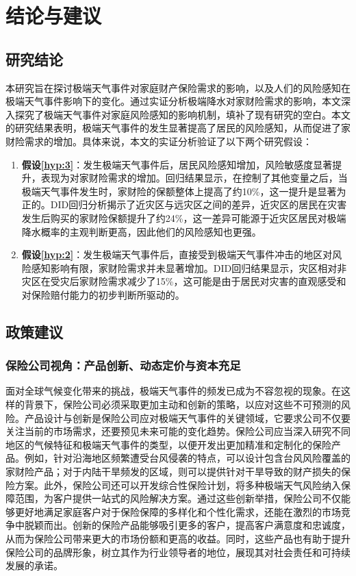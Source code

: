 \chapter{结论与建议}\label{chap:5}

\section{研究结论}
本研究旨在探讨极端天气事件对家庭财产保险需求的影响，以及人们的风险感知在极端天气事件影响下的变化。通过实证分析极端降水对家财险需求的影响，本文深入探究了极端天气事件对家庭风险感知的影响机制，填补了现有研究的空白。本文的研究结果表明，极端天气事件的发生显著提高了居民的风险感知，从而促进了家财险需求的增加。具体来说，本文的实证分析验证了以下两个研究假设：

\begin{enumerate}
    \item \textbf{假设\ref{hyp:3}}：发生极端天气事件后，居民风险感知增加，风险敏感度显著提升，表现为对家财险需求的增加。回归结果显示，在控制了其他变量之后，当极端天气事件发生时，家财险的保额整体上提高了约10\%，这一提升是显著为正的。DID回归分析揭示了近灾区与远灾区之间的差异，近灾区的居民在灾害发生后购买的家财险保额提升了约24\%，这一差异可能源于近灾区居民对极端降水概率的主观判断更高，因此他们的风险感知也更强。
    \item \textbf{假设\ref{hyp:2}}：发生极端天气事件后，直接受到极端天气事件冲击的地区对风险感知影响有限，家财险需求并未显著增加。DID回归结果显示，灾区相对非灾区在受灾后家财险需求减少了15\%，这可能是由于居民对灾害的直观感受和对保险赔付能力的初步判断所驱动的。
\end{enumerate}

\section{政策建议}
\subsection{保险公司视角：产品创新、动态定价与资本充足}
面对全球气候变化带来的挑战，极端天气事件的频发已成为不容忽视的现象。在这样的背景下，保险公司必须采取更加主动和创新的策略，以应对这些不可预测的风险。产品设计与创新是保险公司应对极端天气事件的关键领域，它要求公司不仅要关注当前的市场需求，还要预见未来可能的变化趋势。保险公司应当深入研究不同地区的气候特征和极端天气事件的类型，以便开发出更加精准和定制化的保险产品。例如，针对沿海地区频繁遭受台风侵袭的特点，可以设计包含台风风险覆盖的家财险产品；对于内陆干旱频发的区域，则可以提供针对干旱导致的财产损失的保险方案。此外，保险公司还可以开发综合性保险计划，将多种极端天气风险纳入保障范围，为客户提供一站式的风险解决方案。通过这些创新举措，保险公司不仅能够更好地满足家庭客户对于保险保障的多样化和个性化需求，还能在激烈的市场竞争中脱颖而出。创新的保险产品能够吸引更多的客户，提高客户满意度和忠诚度，从而为保险公司带来更大的市场份额和更高的收益。同时，这些产品也有助于提升保险公司的品牌形象，树立其作为行业领导者的地位，展现其对社会责任和可持续发展的承诺。

